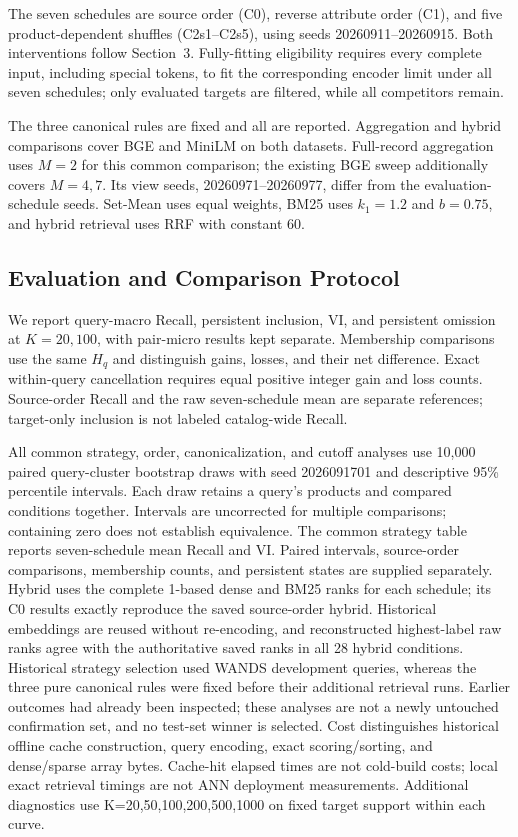 The seven schedules are source order (C0), reverse attribute order (C1), and five product-dependent shuffles (C2s1--C2s5), using seeds 20260911--20260915. Both interventions follow Section~3. Fully-fitting eligibility requires every complete input, including special tokens, to fit the corresponding encoder limit under all seven schedules; only evaluated targets are filtered, while all competitors remain.

The three canonical rules are fixed and all are reported. Aggregation and hybrid comparisons cover BGE and MiniLM on both datasets. Full-record aggregation uses $M=2$ for this common comparison; the existing BGE sweep additionally covers $M=4,7$. Its view seeds, 20260971--20260977, differ from the evaluation-schedule seeds. Set-Mean uses equal weights, BM25 uses $k_1=1.2$ and $b=0.75$, and hybrid retrieval uses RRF with constant 60.

\subsection{Evaluation and Comparison Protocol}
\label{sec:comparison_protocol}

We report query-macro Recall, persistent inclusion, VI, and persistent omission at $K=20,100$, with pair-micro results kept separate. Membership comparisons use the same $H_q$ and distinguish gains, losses, and their net difference. Exact within-query cancellation requires equal positive integer gain and loss counts. Source-order Recall and the raw seven-schedule mean are separate references; target-only inclusion is not labeled catalog-wide Recall.

All common strategy, order, canonicalization, and cutoff analyses use 10,000 paired query-cluster bootstrap draws with seed 2026091701 and descriptive 95\% percentile intervals. Each draw retains a query's products and compared conditions together. Intervals are uncorrected for multiple comparisons; containing zero does not establish equivalence. The common strategy table reports seven-schedule mean Recall and VI. Paired intervals, source-order comparisons, membership counts, and persistent states are supplied separately. Hybrid uses the complete 1-based dense and BM25 ranks for each schedule; its C0 results exactly reproduce the saved source-order hybrid. Historical embeddings are reused without re-encoding, and reconstructed highest-label raw ranks agree with the authoritative saved ranks in all 28 hybrid conditions. Historical strategy selection used WANDS development queries, whereas the three pure canonical rules were fixed before their additional retrieval runs. Earlier outcomes had already been inspected; these analyses are not a newly untouched confirmation set, and no test-set winner is selected. Cost distinguishes historical offline cache construction, query encoding, exact scoring/sorting, and dense/sparse array bytes. Cache-hit elapsed times are not cold-build costs; local exact retrieval timings are not ANN deployment measurements. Additional diagnostics use K=20,50,100,200,500,1000 on fixed target support within each curve.
